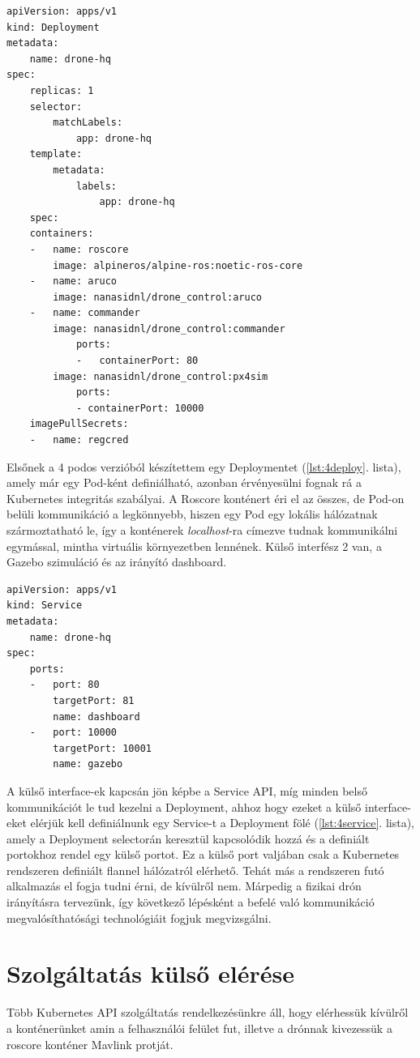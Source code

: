 \begin{lstlisting}[caption={Példa 4 konténeres deployment megoldásra},label={lst:4deploy}]
apiVersion: apps/v1
kind: Deployment
metadata:
	name: drone-hq
spec:
	replicas: 1
	selector:
		matchLabels:
			app: drone-hq
	template:
		metadata:
			labels:
				app: drone-hq
	spec:
	containers:
	-	name: roscore
		image: alpineros/alpine-ros:noetic-ros-core 
	-	name: aruco
		image: nanasidnl/drone_control:aruco
	- 	name: commander
		image: nanasidnl/drone_control:commander
			ports: 
			-	containerPort: 80
		image: nanasidnl/drone_control:px4sim
			ports: 
			- containerPort: 10000
	imagePullSecrets:
	-	name: regcred
\end{lstlisting}

\noindent
Elsőnek a 4 podos verzióból készítettem egy Deploymentet (\ref{lst:4deploy}. lista), amely már egy Pod-ként definiálható, azonban érvényesülni fognak rá a Kubernetes integritás szabályai. A Roscore konténert éri el az összes, de Pod-on belüli kommunikáció a legkönnyebb, hiszen egy Pod egy lokális hálózatnak szármoztatható le, így a konténerek \emph{localhost}-ra címezve tudnak kommunikálni egymással, mintha virtuális környezetben lennének. Külső interfész 2 van, a Gazebo szimuláció és az irányító dashboard. \\

\begin{lstlisting}[caption={Példa 4 konténeres megoldás service kivezetésére},label={lst:4service}]
apiVersion: apps/v1
kind: Service
metadata:
	name: drone-hq
spec:
	ports:
	-	port: 80
		targetPort: 81
		name: dashboard
	-	port: 10000
		targetPort: 10001
		name: gazebo
\end{lstlisting}

\noindent
A külső interface-ek kapcsán jön képbe a Service API, míg minden belső kommunikációt le tud kezelni a Deployment, ahhoz hogy ezeket a külső interface-eket elérjük kell definiálnunk egy Service-t a Deployment fölé (\ref{lst:4service}. lista), amely a Deployment selectorán keresztül kapcsolódik hozzá és a definiált portokhoz rendel egy külső portot. Ez a külső port valjában csak a Kubernetes rendszeren definiált flannel hálózatról elérhető. Tehát más a rendszeren futó alkalmazás el fogja tudni érni, de kívülről nem. Márpedig a fizikai drón irányításra tervezünk, így következő lépésként a befelé való kommunikáció megvalósíthatósági technológiáit fogjuk megvizsgálni.

\section{Szolgáltatás külső elérése}
Több Kubernetes API szolgáltatás rendelkezésünkre áll, hogy elérhessük kívülről a konténerünket amin a felhasználói felület fut, illetve a drónnak kivezessük a roscore konténer Mavlink protját.

